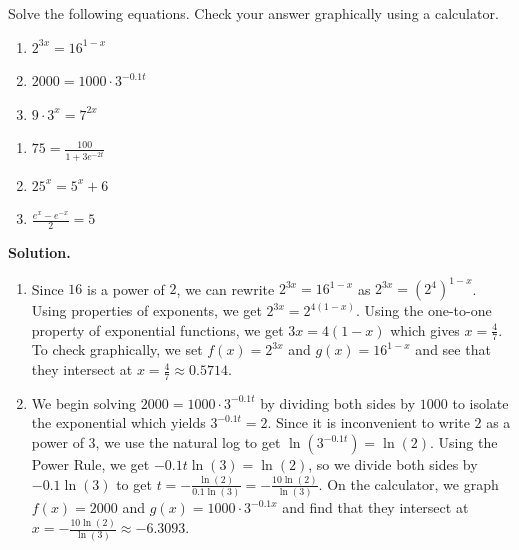 \begin{ex}  \label{expeqnsex1} Solve the following equations.  Check your answer graphically using a calculator.

\begin{multicols}{3}
\begin{enumerate}

\item  $2^{3x} = 16^{1-x}$

\item  $2000 = 1000 \cdot 3^{-0.1 t}$ 

\item  $9 \cdot 3^{x} = 7^{2x}$

\setcounter{HW}{\value{enumi}}
\end{enumerate}
\end{multicols}

\begin{multicols}{3}
\begin{enumerate}
\setcounter{enumi}{\value{HW}}

\item  $75 = \frac{100}{1 + 3e^{-2t}}$

\item  $25^{x} = 5^{x} + 6$

\item  $\frac{e^{x} - e^{-x}}{2} = 5$

\end{enumerate}
\end{multicols}

{\bf Solution.}

\begin{enumerate}

\item  Since $16$ is a power of $2$, we can rewrite  $2^{3x} =  16^{1-x}$ as $2^{3x} = \left(2^4\right)^{1-x}$.  Using properties of exponents, we get $2^{3x} = 2^{4(1-x)}$.  Using the one-to-one property of exponential functions, we get $3x = 4(1-x)$ which gives $x=\frac{4}{7}$. To check graphically, we set $f(x) = 2^{3x}$ and $g(x) = 16^{1-x}$ and see that they intersect at $x=\frac{4}{7} \approx 0.5714$.

\item  We begin solving $2000 = 1000 \cdot 3^{-0.1 t}$  by dividing both sides by $1000$ to isolate the exponential which yields $3^{-0.1t} = 2$.  Since it is inconvenient to write $2$ as a power of $3$, we use the natural log to get $\ln\left(3^{-0.1t}\right) = \ln(2)$.  Using the Power Rule, we get $-0.1 t \ln(3) = \ln(2)$, so we divide both sides by $-0.1 \ln(3)$ to get $t = -\frac{\ln(2)}{0.1 \ln(3)} = -\frac{10\ln(2)}{\ln(3)}$.  On the calculator, we graph $f(x) = 2000$ and $g(x) =  1000 \cdot 3^{-0.1 x}$ and find that they intersect at $x = -\frac{10\ln(2)}{\ln(3)} \approx -6.3093$.


\end{enumerate}
\end{ex}
